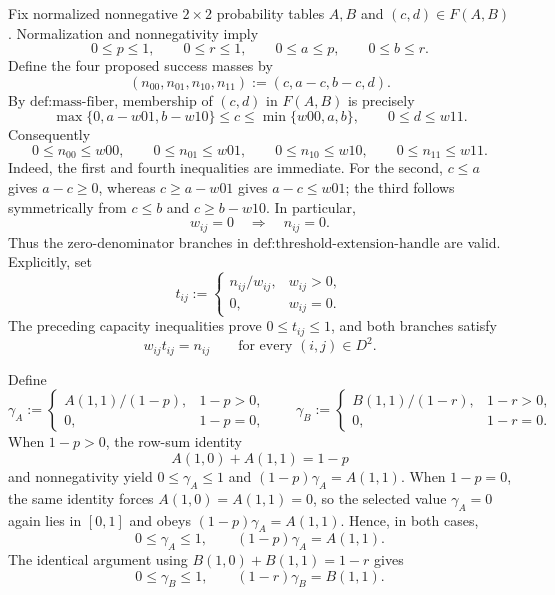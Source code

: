 Fix normalized nonnegative \(2\times2\) probability tables \(A,B\) and \((c,d)\in F(A,B)\).  Normalization and nonnegativity imply
\[
0\le p\le1,\qquad 0\le r\le1,\qquad 0\le a\le p,\qquad 0\le b\le r.
\]
Define the four proposed success masses by
\[
(n_{00},n_{01},n_{10},n_{11}):=(c,a-c,b-c,d).
\]
By \(\text{def:mass-fiber}\), membership of \((c,d)\) in \(F(A,B)\) is precisely
\[
\max\{0,a-w01,b-w10\}\le c\le\min\{w00,a,b\},
\qquad 0\le d\le w11.
\]
Consequently
\[
0\le n_{00}\le w00,
\qquad
0\le n_{01}\le w01,
\qquad
0\le n_{10}\le w10,
\qquad
0\le n_{11}\le w11.
\]
Indeed, the first and fourth inequalities are immediate.  For the second, \(c\le a\) gives \(a-c\ge0\), whereas \(c\ge a-w01\) gives \(a-c\le w01\); the third follows symmetrically from \(c\le b\) and \(c\ge b-w10\).  In particular,
\[
w_{ij}=0\quad\Longrightarrow\quad n_{ij}=0.
\]
Thus the zero-denominator branches in \(\text{def:threshold-extension-handle}\) are valid.  Explicitly, set
\[
t_{ij}:=
\begin{cases}
n_{ij}/w_{ij},&w_{ij}>0,\\
0,&w_{ij}=0.
\end{cases}
\]
The preceding capacity inequalities prove \(0\le t_{ij}\le1\), and both branches satisfy
\[
w_{ij}t_{ij}=n_{ij}
\qquad\text{for every }(i,j)\in D^2.
\]

Define
\[
\gamma_A:=
\begin{cases}
A(1,1)/(1-p),&1-p>0,\\
0,&1-p=0,
\end{cases}
\qquad
\gamma_B:=
\begin{cases}
B(1,1)/(1-r),&1-r>0,\\
0,&1-r=0.
\end{cases}
\]
When \(1-p>0\), the row-sum identity
\[
A(1,0)+A(1,1)=1-p
\]
and nonnegativity yield \(0\le\gamma_A\le1\) and \((1-p)\gamma_A=A(1,1)\).  When \(1-p=0\), the same identity forces \(A(1,0)=A(1,1)=0\), so the selected value \(\gamma_A=0\) again lies in \([0,1]\) and obeys \((1-p)\gamma_A=A(1,1)\).  Hence, in both cases,
\[
0\le\gamma_A\le1,
\qquad
(1-p)\gamma_A=A(1,1).
\]
The identical argument using \(B(1,0)+B(1,1)=1-r\) gives
\[
0\le\gamma_B\le1,
\qquad
(1-r)\gamma_B=B(1,1).
\]

